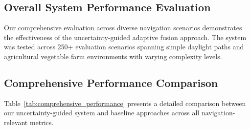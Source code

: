 \documentclass[10pt]{article}
\newcommand{\tabref}[1]{Table~\ref{#1}}
\begin{document}
\subsection{Overall System Performance Evaluation}

Our comprehensive evaluation across diverse navigation scenarios demonstrates the effectiveness of the uncertainty-guided adaptive fusion approach. The system was tested across 250+ evaluation scenarios spanning simple daylight paths and agricultural vegetable farm environments with varying complexity levels.

\subsection{Comprehensive Performance Comparison}

\tabref{tab:comprehensive_performance} presents a detailed comparison between our uncertainty-guided system and baseline approaches across all navigation-relevant metrics.

\begin{table}[ht]
\centering
\caption{Comprehensive Performance Comparison: Uncertainty-Guided System vs Baselines}
\label{tab:comprehensive_performance}
\end{table}
\end{document}
